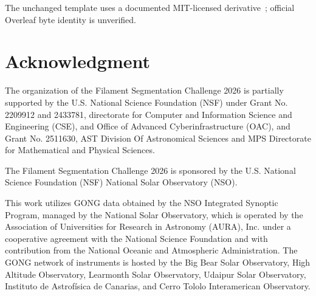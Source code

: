 \documentclass[sigconf]{acmart}
\begin{document}
The unchanged template uses a documented MIT-licensed derivative~\cite{pawar2026template}; official Overleaf byte identity is unverified.

\section{Acknowledgment}\label{sec:acknowledgment}
The organization of the Filament Segmentation Challenge 2026 is partially supported by the U.S. National Science Foundation (NSF) under Grant No. 2209912 and 2433781, directorate for Computer and Information Science and Engineering (CSE), and Office of Advanced Cyberinfrastructure (OAC), and Grant No. 2511630, AST Division Of Astronomical Sciences and MPS Directorate for Mathematical and Physical Sciences.

The Filament Segmentation Challenge 2026 is sponsored by the U.S. National Science Foundation (NSF) National Solar Observatory (NSO).

This work utilizes GONG data obtained by the NSO Integrated Synoptic Program, managed by the National Solar Observatory, which is operated by the Association of Universities for Research in Astronomy (AURA), Inc. under a cooperative agreement with the National Science Foundation and with contribution from the National Oceanic and Atmospheric Administration. The GONG network of instruments is hosted by the Big Bear Solar Observatory, High Altitude Observatory, Learmonth Solar Observatory, Udaipur Solar Observatory, Instituto de Astrofísica de Canarias, and Cerro Tololo Interamerican Observatory.



\end{document}
